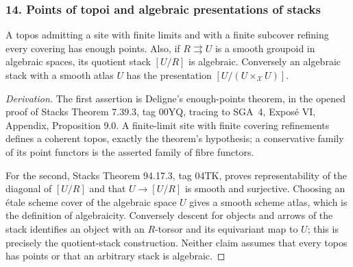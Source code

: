 \subsubsection{14. Points of topoi and algebraic presentations of stacks}
\begin{proposition}\label{B:subject14}
A topos admitting a site with finite limits and with a finite subcover refining every covering has enough points. Also, if $R\rightrightarrows U$ is a smooth groupoid in algebraic spaces, its quotient stack $[U/R]$ is algebraic. Conversely an algebraic stack with a smooth atlas $U$ has the presentation $[U/(U\times_{\mathcal X}U)]$.
\end{proposition}
\begin{proof}[Derivation]
The first assertion is Deligne's enough-points theorem, in the opened proof of Stacks Theorem 7.39.3, tag 00YQ, tracing to SGA~4, Expos\'e VI, Appendix, Proposition 9.0. A finite-limit site with finite covering refinements defines a coherent topos, exactly the theorem's hypothesis; a conservative family of its point functors is the asserted family of fibre functors.

For the second, Stacks Theorem 94.17.3, tag 04TK, proves representability of the diagonal of $[U/R]$ and that $U\to[U/R]$ is smooth and surjective. Choosing an \'etale scheme cover of the algebraic space $U$ gives a smooth scheme atlas, which is the definition of algebraicity. Conversely descent for objects and arrows of the stack identifies an object with an $R$-torsor and its equivariant map to $U$; this is precisely the quotient-stack construction. Neither claim assumes that every topos has points or that an arbitrary stack is algebraic.
\end{proof}

